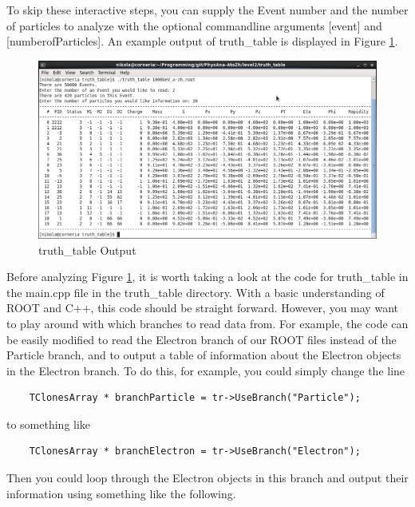 \documentclass{article}
\begin{document}
\bigskip

To skip these interactive steps, you can supply the Event number and the number of
particles to analyze with the optional commandline arguments [event] and [numberofParticles].
An example output of truth\_table is displayed in Figure \ref{fig:truthTableOutput}.

\begin{figure}[h]
	\centering
	\includegraphics[width = \linewidth]{truth_table_screenshot.png}
	\caption{truth\_table Output}
	\label{fig:truthTableOutput}
\end{figure}

\bigskip

Before analyzing Figure \ref{fig:truthTableOutput}, it is worth taking a look at the code for
truth\_table in the main.cpp file in the truth\_table directory. With a basic understanding of
ROOT and C++, this code should be straight forward. However, you may want to play around with
which branches to read data from. For example, the code can be easily modified to read the
Electron branch of our ROOT files instead of the Particle branch, and to output a table of
information about the Electron objects in the Electron branch. To do this, for example, you
could simply change the line

\begin{verbatim}
	TClonesArray * branchParticle = tr->UseBranch("Particle");
\end{verbatim}

to something like

\begin{verbatim}
	TClonesArray * branchElectron = tr->UseBranch("Electron");
\end{verbatim}

Then you could loop through the Electron objects in this branch and output their information
using something like the following.
\end{document}
